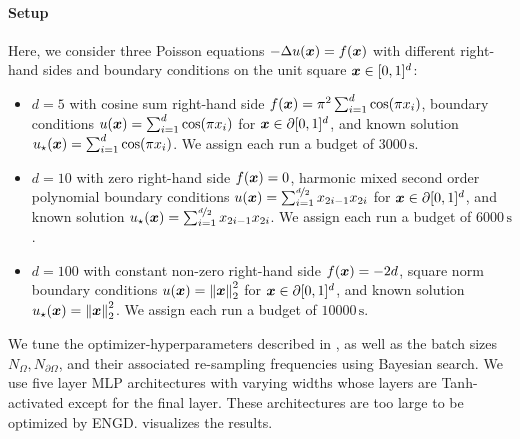 \paragraph{Setup} Here, we consider three Poisson equations $- \Delta u({\bm{x}}) = f({\bm{x}})$ with different right-hand sides and boundary conditions on the unit square ${\bm{x}} \in [0, 1]^d$:
\begin{itemize}
\item $d=5$ with cosine sum right-hand side $f({\bm{x}}) = \pi^2 \sum_{i=1}^d \cos(\pi {x}_i)$, boundary conditions $u({\bm{x}}) = \sum_{i=1}^d \cos(\pi {x}_i)$ for ${\bm{x}} \in \partial [0,1]^d$, and known solution $u_{\star}({\bm{x}}) = \sum_{i=1}^d \cos(\pi {x}_i)$.
  We assign each run a budget of $\num{3000}\,\text{s}$.

\item $d=10$ with zero right-hand side $f({\bm{x}}) = 0$, harmonic mixed second order polynomial boundary conditions $u({\bm{x}}) = \sum_{i=1}^{\nicefrac{d}{2}} {x}_{2i-1} {x}_{2i}$ for ${\bm{x}} \in \partial [0,1]^d$, and known solution $u_{\star}({\bm{x}}) =  \sum_{i=1}^{\nicefrac{d}{2}} {x}_{2i-1} {x}_{2i}$.
  We assign each run a budget of $\num{6000}\,\text{s}$.

\item $d=100$ with constant non-zero right-hand side $f({\bm{x}}) = -2 d$, square norm boundary conditions $u({\bm{x}}) = \left\lVert {\bm{x}} \right\rVert_2^2$ for ${\bm{x}} \in \partial [0,1]^d$, and known solution $u_{\star}({\bm{x}}) =  \left\lVert {\bm{x}} \right\rVert_2^2$.
  We assign each run a budget of $\num{10000}\,\text{s}$.
\end{itemize}
We tune the optimizer-hyperparameters described in , as well as the batch sizes $N_{\Omega}, N_{\partial \Omega}$, and their associated re-sampling frequencies using Bayesian search.
We use five layer MLP architectures with varying widths whose layers are Tanh-activated except for the final layer.
These architectures are too large to be optimized by ENGD.
 visualizes the results.

